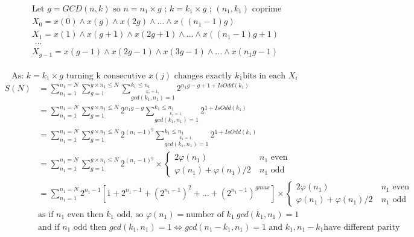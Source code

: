 \documentclass[10pt,a4paper]{letter}
\begin{document}
\begin{align*}
	&\text{Let }g=GCD(n,k)\text{ so }n=n_{1}\times g\text{ ; }k= k_{1}\times g\text{ ; }(n_{1},k_{1})\text{ coprime}\\
	&X_{0}=x(0)\wedge x(g)\wedge x(2g)\wedge ...\wedge x((n_{1}-1)g)  \\
	&X_{1}=x(1)\wedge x(g+1)\wedge x(2g+1)\wedge ...\wedge x((n_{1}-1)g+1) \\
	&\text{  ... }\\
	&X_{g-1}=x(g-1)\wedge x(2g-1)\wedge x(3g-1)\wedge ...\wedge x(n_{1}g-1)\\  
\end{align*}	

	$$ \text{ As: }k=k_{1} \times g\text{ turning k consecutive }x(j)\text{ changes exactly }k_{1}\text{bits in each }X_{i} $$
\begin{align*}	
	S(N)&=\sum_{n_{1}=1}^{n_{1}=N}\sum_{g=1}^{g\times n_{1}\leq N}\sum_{\stackrel{k_{1}=1,}{gcd(k_{1},n_{1})=1}}^{k_{1}\leq n_{1}}2^{n_{1}g-g+1+IsOdd(k_{1})}\\
	&=\sum_{n_{1}=1}^{n_{1}=N}\sum_{g=1}^{g\times n_{1}\leq N}2^{n_{1}g-g}\sum_{\stackrel{k_{1}=1,}{gcd(k_{1},n_{1})=1}}^{k_{1}\leq n_{1}}2^{1+IsOdd(k_{1})}\\
	&=\sum_{n_{1}=1}^{n_{1}=N}\sum_{g=1}^{g\times n_{1}\leq N}2^{(n_{1}-1)^{g}}\sum_{\stackrel{k_{1}=1,}{gcd(k_{1},n_{1})=1}}^{k_{1}\leq n_{1}}2^{1+IsOdd(k_{1})}\\
	&=\sum_{n_{1}=1}^{n_{1}=N}\sum_{g=1}^{g\times n_{1}\leq N}2^{(n_{1}-1)^{g}} \times \begin{cases}2\varphi(n_{1})&\ n_{1} \text{ even}\\ \varphi(n_{1})+\varphi(n_{1})/2 &\ n_{1} \text{ odd}\end{cases}\\
	&=\sum_{n_{1}=1}^{n_{1}=N}2^{n_{1}-1}[1+2^{n_{1}-1}+(2^{n_{1}-1})^2+...+(2^{n_{1}-1})^{gmax}]\times \begin{cases}2\varphi(n_{1})&\ n_{1} \text{ even}\\ \varphi(n_{1})+\varphi(n_{1})/2 &\ n_{1} \text{ odd}\end{cases}\\
	&\text{as if }n_{1} \text{ even then } k_{1} \text{ odd, so } \varphi(n_{1})=\text{number of }k_{1}\ gcd(k_{1},n_{1})=1\\
	&\text{and if }n_{1} \text{ odd then } gcd(k_{1},n_{1})=1\Leftrightarrow gcd(n_{1}-k_{1},n_{1})=1 \text{ and }k_{1},n_{1}-k_{1}\text {have different parity} \\	
\end{align*}	
\end{document}
